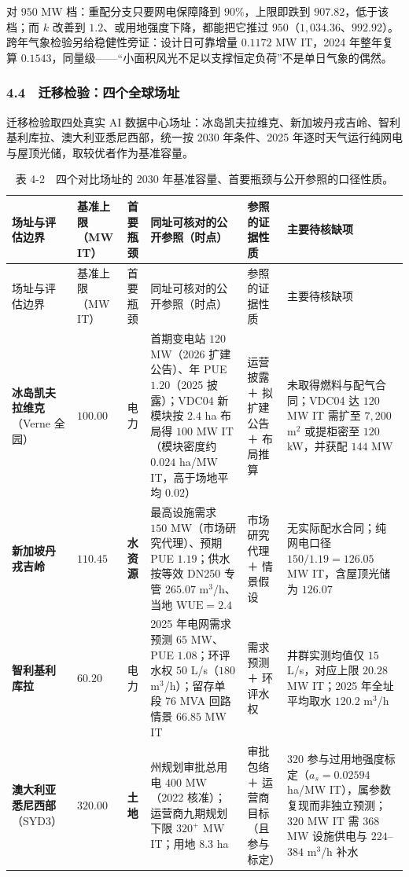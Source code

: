 对 $950$ MW 档：重配分支只要网电保障降到 $90\%$，上限即跌到 $907.82$，低于该档；而 $k$ 改善到 $1.2$、或用地强度下降，都能把它推过 $950$（$1{,}034.36$、$992.92$）。跨年气象检验另给稳健性旁证：设计日可靠增量 $0.1172$ MW IT，2024 年整年复算 $0.1543$，同量级——“小面积风光不足以支撑恒定负荷”不是单日气象的偶然。\cite{apxref10}

\subsubsection{4.4　迁移检验：四个全球场址}

迁移检验取四处真实 AI 数据中心场址：冰岛凯夫拉维克、新加坡丹戎吉岭、智利基利库拉、澳大利亚悉尼西部，统一按 2030 年条件、2025 年逐时天气运行纯网电与屋顶光储，取较优者作为基准容量。\cite{apxref15}

{\footnotesize
\setlength{\tabcolsep}{3pt}
\begin{longtable}{@{}p{}p{}p{}p{}p{}p{}@{}}
\caption{表 4-2　四个对比场址的 2030 年基准容量、首要瓶颈与公开参照的口径性质。}
\label{tab:4-2}\\
\toprule
场址与评估边界 & 基准上限（MW IT） & 首要瓶颈 & 同址可核对的公开参照（时点） & 参照的证据性质 & 主要待核缺项 \\
\midrule
\endfirsthead
\toprule
场址与评估边界 & 基准上限（MW IT） & 首要瓶颈 & 同址可核对的公开参照（时点） & 参照的证据性质 & 主要待核缺项 \\
\midrule
\endhead
\bottomrule
\endlastfoot
\textbf{冰岛凯夫拉维克}（Verne 全园） & $100.00$ & 电力 & 首期变电站 $120$ MW（2026 扩建公告）、年 PUE $1.20$（2025 披露）；VDC04 新模块按 $2.4$ ha 布局得 $100$ MW IT（模块密度约 $0.024$ ha/MW IT，高于场地平均 $0.02$）\cite{apxref16,apxref17,apxref18} & 运营披露 ＋ 拟扩建公告 ＋ 布局推算 & 未取得燃料与配气合同；VDC04 达 $120$ MW IT 需扩至 $7{,}200$ m$^2$ 或提柜密至 $120$ kW，并获配 $144$ MW \\
\textbf{新加坡丹戎吉岭} & $110.45$ & \textbf{水资源} & 最高设施需求 $150$ MW（市场研究代理）、预期 PUE $1.19$；供水按等效 DN250 专管 $265.07$ m$^3$/h、当地 $\mathrm{WUE}=2.4$ \cite{apxref19,apxref20,apxref21} & 市场研究代理 ＋ 情景假设 & 无实际配水合同；纯网电口径 $150/1.19=126.05$ MW IT，含屋顶光储为 $126.07$ \\
\textbf{智利基利库拉} & $60.20$ & 电力 & 2025 年电网需求预测 $65$ MW、PUE $1.08$；环评水权 $50$ L/s（$180$ m$^3$/h）；留存单段 $76$ MVA 回路情景 $66.85$ MW IT \cite{apxref22,apxref23,apxref24} & 需求预测 ＋ 环评水权 & 井群实测均值仅 $15$ L/s，对应上限 $20.28$ MW IT；2025 年全址平均取水 $120.2$ m$^3$/h \\
\textbf{澳大利亚悉尼西部}（SYD3） & $320.00$ & \textbf{土地} & 州规划审批总用电 $400$ MW（2022 核准）；运营商九期规划下限 $320^+$ MW IT；用地 $8.3$ ha \cite{apxref25,apxref26,apxref27} & 审批包络 ＋ 运营商目标（且参与标定） & $320$ 参与过用地强度标定（$a_s=0.02594$ ha/MW IT），属参数复现而非独立预测；$320$ MW IT 需 $368$ MW 设施供电与 $224$–$384$ m$^3$/h 补水 \\
\end{longtable}
\par}

